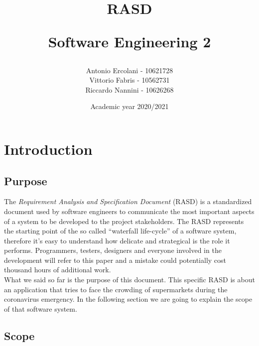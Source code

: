 \documentclass[]{article}
\title{ RASD \\
	\begin{large} 
		Software Engineering 2
	\end{large}}
\author{Antonio Ercolani - 10621728\\Vittorio Fabris - 10562731\\Riccardo Nannini - 10626268}
\date{Academic year 2020/2021}
\begin{document}
	
	\maketitle
	

	\newpage


	\tableofcontents
	
	\newpage
	
	
	\section{Introduction}
	
	\subsection{Purpose}
	
	The \textit{Requirement Analysis and Specification Document} (RASD) is a standardized document used by software engineers to communicate the most important aspects of a system to be developed to the project stakeholders. The RASD represents the starting point of the so called “waterfall life-cycle” of a software system, therefore it’s easy to understand how delicate and strategical is the role it performs. Programmers, testers, designers and everyone involved in the development will refer to this paper and a mistake could potentially cost thousand hours of additional work. 
	\smallskip
	\\
	What we said so far is the purpose of this document. This specific RASD is about an application that tries to face the crowding of supermarkets during the coronavirus emergency. In the following section we are going to explain the scope of that software system.

	\subsection{Scope}
	
\end{document}
